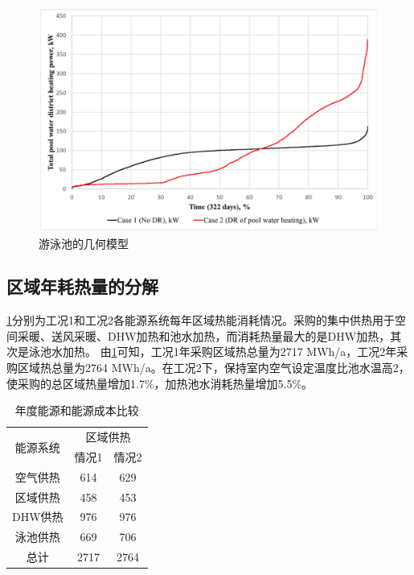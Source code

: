 \documentclass[hyperref]{ctexart}
\begin{document}
\begin{multicols}{2}
		\par
		\begin{figure}[htbp]
			\centering
			\includegraphics[scale=0.4]{figure_translate/13.png}
			\caption{游泳池的几何模型}
			\label{fig13}
		\end{figure}
		\subsection{区域年耗热量的分解}
		\cref{tab11}分别为工况1和工况2各能源系统每年区域热能消耗情况。采购的集中供热用于空间采暖、送风采暖、DHW加热和池水加热，而消耗热量最大的是DHW加热，其次是泳池水加热。
		由\cref{tab11}可知，工况1年采购区域热总量为2717 MWh/a，工况2年采购区域热总量为2764 MWh/a。在工况2下，保持室内空气设定温度比池水温高2\textcelsius，使采购的总区域热量增加1.7\%，加热池水消耗热量增加5.5\%。
		\par
		\begin{table}[H]
			\centering
			\caption{年度能源和能源成本比较}
			\begin{tabular}{ccc}
				\toprule
				\multirow{2}{*}{能源系统} & \multicolumn{2}{c}{区域供热} \\
				\cmidrule{2-3}
				~ & 情况1 & 情况2 \\
				\midrule
				空气供热 & 614 & 629 \\
				区域供热 & 458 & 453 \\
				DHW供热 & 976 & 976\\
				泳池供热 & 669 & 706\\
				总计 & 2717 & 2764\\
				\bottomrule
			\end{tabular}
			\label{tab11}
		\end{table}

\end{multicols}
\end{document}
